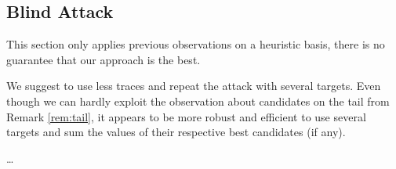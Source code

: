 


\subsection{Blind Attack}
\label{sec:subblindattack}

\begin{note}
	This section only applies previous observations on a heuristic basis, there is no guarantee that our approach is the best.
\end{note}

We suggest to use less traces and repeat the attack with several targets. Even though we can hardly exploit the observation about candidates on the tail from Remark \ref{rem:tail}, it appears to be more robust and efficient to use several targets and sum the values of their respective best candidates (if any).

\ldots


